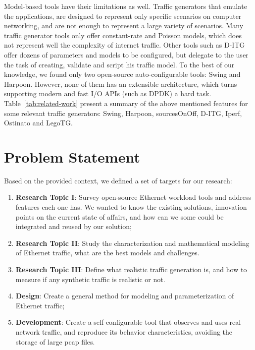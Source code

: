 Model-based tools have their limitations as well. Traffic generators that emulate the applications,  are designed to represent only specific scenarios on computer networking, and are not enough to represent a large variety of scenarios. Many  traffic generator tools only offer constant-rate and Poisson models, which does not represent well the complexity of internet traffic\cite{selfsimilar-ethernet}. Other tools such as D-ITG offer dozens of parameters and models to be configured, but delegate to the user the task of creating, validate and script his traffic model. To the best of our knowledge, we found only two open-source auto-configurable tools: Swing and Harpoon.  However, none of them has an extensible architecture, which turns supporting modern and fast \acrshort{I/O} \acrshort{API}s (such as DPDK\cite{web-dpdk}) a hard task. Table~\ref{tab:related-work} present a summary of the above mentioned features for some relevant traffic generators: Swing\cite{swing-paper}, Harpoon\cite{harpoon-validation}, sourcesOnOff\cite{sourcesonoff-paper}, D-ITG\cite{ditg-paper}, Iperf\cite{web-iperf}, Ostinato\cite{web-ostinato} and LegoTG\cite{legotg-paper}.


\section{Problem Statement}


Based on the provided context, we defined a set of targets for our research:


\begin{enumerate}

	\item \textbf{Research Topic I}:  Survey open-source Ethernet workload tools and address features each one has. We wanted to know the existing solutions, innovation points on the current state of affairs, and how can we some could be integrated and reused by our solution;
	
	\item \textbf{Research Topic II}: Study the characterization and mathematical modeling of Ethernet traffic, what are the best models and challenges. 
	
	\item \textbf{Research Topic III}: Define what realistic traffic generation is, and how to measure if any synthetic traffic is realistic or not. 
	
	\item \textbf{Design}: Create a general method for modeling and parameterization of Ethernet traffic;
	
	\item \textbf{Development}:  Create a self-configurable tool that observes and uses real network traffic, and reproduce its behavior characteristics, avoiding the storage of large pcap files. 
	
\end{enumerate}

